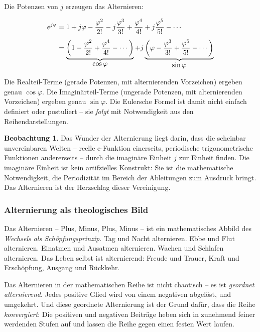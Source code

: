 ﻿\documentclass[a4paper,12pt]{article}
\theoremstyle{definition}
\newtheorem{observation}{Beobachtung}[section]
\begin{document}
Die Potenzen von $j$ erzeugen das Alternieren:

\begin{align}
	e^{j\varphi} &= 1 + j\varphi - \frac{\varphi^2}{2!} - j\frac{\varphi^3}{3!}
	+ \frac{\varphi^4}{4!} + j\frac{\varphi^5}{5!} - \cdots \notag\\[4pt]
	&= \underbrace{\left(1 - \frac{\varphi^2}{2!} + \frac{\varphi^4}{4!}
		- \cdots\right)}_{\displaystyle\cos\varphi}
	+ j\underbrace{\left(\varphi - \frac{\varphi^3}{3!} + \frac{\varphi^5}{5!}
		- \cdots\right)}_{\displaystyle\sin\varphi}
\end{align}

Die Realteil-Terme (gerade Potenzen, mit alternierenden Vorzeichen) ergeben genau
$\cos\varphi$. Die Imaginärteil-Terme (ungerade Potenzen, mit alternierenden
Vorzeichen) ergeben genau $\sin\varphi$. Die Eulersche Formel ist damit nicht
einfach definiert oder postuliert -- sie \textit{folgt} mit Notwendigkeit aus
den Reihendarstellungen.

\begin{observation}
	Das Wunder der Alternierung liegt darin, dass die scheinbar unvereinbaren
	Welten -- reelle e-Funktion einerseits, periodische trigonometrische
	Funktionen andererseits -- durch die imaginäre Einheit $j$ zur Einheit finden.
	Die imaginäre Einheit ist kein artifzielles Konstrukt: Sie ist die mathematische
	Notwendigkeit, die Periodizität im Bereich der Ableitungen zum Ausdruck bringt.
	Das Alternieren ist der Herzschlag dieser Vereinigung.
\end{observation}

\subsubsection{Alternierung als theologisches Bild}

Das Alternieren -- Plus, Minus, Plus, Minus -- ist ein mathematisches Abbild
des \textit{Wechsels als Schöpfungsprinzip}. Tag und Nacht alternieren. Ebbe
und Flut alternieren. Einatmen und Ausatmen alternieren. Wachen und Schlafen
alternieren. Das Leben selbst ist alternierend: Freude und Trauer, Kraft und
Erschöpfung, Ausgang und Rückkehr.

Das Alternieren in der mathematischen Reihe ist nicht chaotisch -- es ist
\textit{geordnet alternierend}. Jedes positive Glied wird von einem negativen
abgelöst, und umgekehrt. Und diese geordnete Alternierung ist der Grund dafür,
dass die Reihe \textit{konvergiert}: Die positiven und negativen Beiträge heben
sich in zunehmend feiner werdenden Stufen auf und lassen die Reihe gegen einen
festen Wert laufen.
\end{document}
